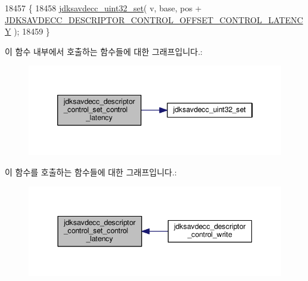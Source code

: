\begin{DoxyCode}
18457 \{
18458     \hyperlink{group__endian_ga59b24ae6f7f47ca4d24ea337543162bf}{jdksavdecc\_uint32\_set}( v, base, pos + 
      \hyperlink{group__descriptor__control_gad65ac48aac959952cb034060d7743e7c}{JDKSAVDECC\_DESCRIPTOR\_CONTROL\_OFFSET\_CONTROL\_LATENCY} );
18459 \}
\end{DoxyCode}


이 함수 내부에서 호출하는 함수들에 대한 그래프입니다.\+:
\nopagebreak
\begin{figure}[H]
\begin{center}
\leavevmode
\includegraphics[width=346pt]{group__descriptor__control_ga342a555f3b2973609238eb1e00af0b1c_cgraph}
\end{center}
\end{figure}




이 함수를 호출하는 함수들에 대한 그래프입니다.\+:
\nopagebreak
\begin{figure}[H]
\begin{center}
\leavevmode
\includegraphics[width=344pt]{group__descriptor__control_ga342a555f3b2973609238eb1e00af0b1c_icgraph}
\end{center}
\end{figure}


